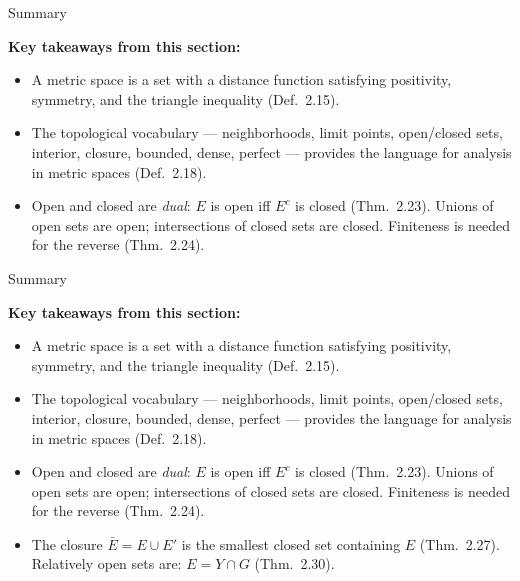 \documentclass[aspectratio=169,12pt,t]{beamer}
\begin{document}
{%
\begin{frame}{Summary}
  \begin{hlbox}
    \textbf{Key takeaways from this section:}
    \begin{itemize}
      \item A \alert{metric space} is a set with a distance function satisfying
        positivity, symmetry, and the triangle inequality (Def.\ 2.15).
      \item The topological vocabulary --- neighborhoods, limit points, open/closed
        sets, interior, closure, bounded, dense, perfect --- provides the
        language for analysis in metric spaces (Def.\ 2.18).
      \item Open and closed are \emph{dual}: $E$ is open iff $E^c$ is closed (Thm.\ 2.23).
        Unions of open sets are open; intersections of
        closed sets are closed. Finiteness is needed for the reverse (Thm.\ 2.24).
    \end{itemize}
  \end{hlbox}

\end{frame}

\begin{frame}{Summary}
  \begin{hlbox}
    \textbf{Key takeaways from this section:}
    \begin{itemize}
      \item A \alert{metric space} is a set with a distance function satisfying
        positivity, symmetry, and the triangle inequality (Def.\ 2.15).
      \item The topological vocabulary --- neighborhoods, limit points, open/closed
        sets, interior, closure, bounded, dense, perfect --- provides the
        language for analysis in metric spaces (Def.\ 2.18).
      \item Open and closed are \emph{dual}: $E$ is open iff $E^c$ is closed (Thm.\ 2.23).
        Unions of open sets are open; intersections of
        closed sets are closed. Finiteness is needed for the reverse (Thm.\ 2.24).
      \item The \alert{closure} $\bar{E} = E \cup E'$ is the smallest closed set containing $E$
        (Thm.\ 2.27). Relatively open sets are: $E = Y \cap G$
        (Thm.\ 2.30).
    \end{itemize}
  \end{hlbox}


\end{frame}}
\end{document}
